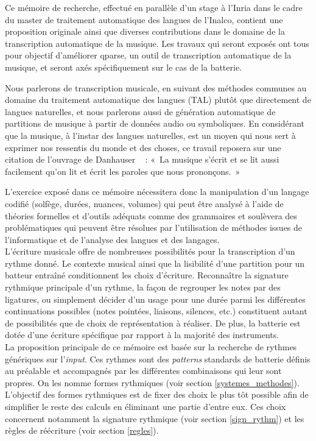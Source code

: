 Ce mémoire de recherche, effectué en parallèle d’un stage à l’Inria dans le
cadre du master de traitement automatique des langues de l’Inalco, contient
une proposition originale ainsi que diverses contributions dans le domaine de
la transcription automatique de la musique. Les travaux qui seront exposés ont
tous pour objectif d’améliorer qparse, un outil de transcription automatique de
la musique, et seront axés spécifiquement sur le cas de la batterie.

Nous parlerons de transcription musicale, en suivant des méthodes communes au
domaine du traitement automatique des langues (TAL) plutôt que directement de
langues naturelles, et nous parlerons aussi de génération automatique de
partitions de musique à partir de données audio ou symboliques. En considérant
que la musique, à l’instar des langues naturelles, est un moyen qui nous sert à
exprimer nos ressentis du monde et des choses, ce travail reposera sur une
citation de l’ouvrage de Danhauser \cite{danhauser}~ : «~La musique s’écrit et
se lit aussi facilement qu’on lit et écrit les paroles que nous prononçons.~»

L’exercice exposé dans ce mémoire nécessitera donc la manipulation d’un langage
codifié (solfège, durées, nuances, volumes) qui peut être analysé à l’aide de
théories formelles et d’outils adéquats comme des grammaires  et soulèvera des
problématiques qui peuvent être résolues par l’utilisation de méthodes issues
de l’informatique et de l’analyse des langues et des langages.\\

L’écriture musicale offre de nombreuses possibilités pour la transcription d’un
rythme donné. Le contexte musical ainsi que la lisibilité d’une partition pour
un batteur entraîné conditionnent les choix d’écriture. Reconnaître la
signature rythmique principale d’un rythme, la façon de regrouper les notes par
des ligatures, ou simplement décider d’un usage pour une durée parmi les
différentes continuations possibles (notes pointées, liaisons, silences, etc.)
constituent autant de possibilités que de choix de représentation à réaliser.
De plus, la batterie est dotée d’une écriture spécifique par rapport à la
majorité des instruments.\\

La proposition principale de ce mémoire est basée sur la recherche de rythmes
génériques sur l’\textit{input}. Ces rythmes sont des \textit{patterns}
standards de batterie définis au préalable et accompagnés par les différentes
combinaisons qui leur sont propres. On les nomme formes rythmiques (voir
section \ref{systemes_methodes}). L’objectif des formes rythmiques est de fixer
des choix le plus tôt possible afin de simplifier le reste des calculs en
éliminant une partie d’entre eux. Ces choix concernent notamment la signature
rythmique (voir section \ref{sign_rythm}) et les règles de réécriture (voir
section \ref{regles}).\\


